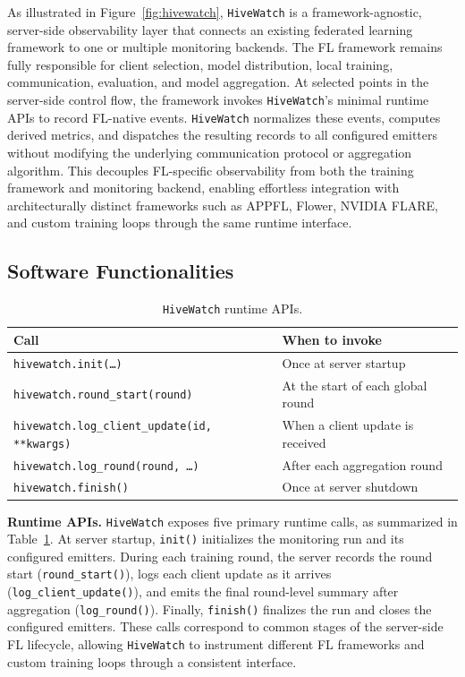 \documentclass[preprint,12pt, a4paper]{elsarticle}
\begin{document}
As illustrated in Figure~\ref{fig:hivewatch}, \texttt{HiveWatch} is a framework-agnostic, server-side observability layer that connects an existing federated learning framework to one or multiple monitoring backends. The FL framework remains fully responsible for client selection, model distribution, local training, communication, evaluation, and model aggregation. At selected points in the server-side control flow, the framework invokes \texttt{HiveWatch}'s minimal runtime APIs to record FL-native events. \texttt{HiveWatch} normalizes these events, computes derived metrics, and dispatches the resulting records to all configured emitters without modifying the underlying communication protocol or aggregation algorithm. This decouples FL-specific observability from both the training framework and monitoring backend, enabling effortless integration with architecturally distinct frameworks such as APPFL, Flower, NVIDIA FLARE, and custom training loops through the same runtime interface.



\subsection{Software Functionalities}

\begin{table}[H]
\caption{\texttt{HiveWatch} runtime APIs.}
\label{tab:api}
\centering
\footnotesize
\begin{tabular}{ll}
\toprule
\textbf{Call} & \textbf{When to invoke} \\
\midrule
\texttt{hivewatch.init(\ldots)}
    & Once at server startup \\
\texttt{hivewatch.round\_start(round)}
    & At the start of each global round \\
\texttt{hivewatch.log\_client\_update(id, **kwargs)}
    & When a client update is received \\
\texttt{hivewatch.log\_round(round, \ldots)}
    & After each aggregation round \\
\texttt{hivewatch.finish()}
    & Once at server shutdown \\
\bottomrule
\end{tabular}
\end{table}


\textbf{Runtime APIs.}
\texttt{HiveWatch} exposes five primary runtime calls, as summarized in Table~\ref{tab:api}. At server startup, \texttt{init()} initializes the monitoring run and its configured emitters. During each training round, the server 
records the round start (\texttt{round\_start()}), logs each client update as it arrives (\texttt{log\_client\_update()}), and emits the final round-level summary after aggregation (\texttt{log\_round()}). Finally, \texttt{finish()} finalizes the run and closes the configured emitters. These calls correspond to common stages of the server-side FL lifecycle, allowing \texttt{HiveWatch} to instrument different FL frameworks and custom training loops through a consistent interface.
\end{document}
